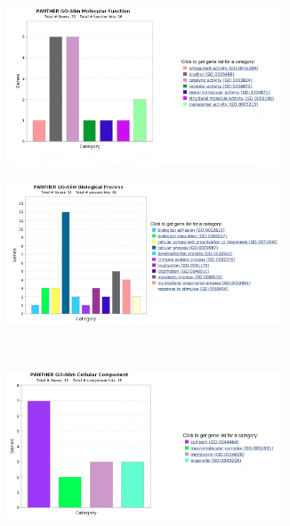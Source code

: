 \begin{figure}[H]
\label{adfigure}
\begin{subfigure}[b]{0.5\linewidth}
\centering
\includegraphics[width=0.9\textwidth]{./Figures/GO/ad/ad1}\par
\end{subfigure}
\begin{subfigure}[b]{0.5\linewidth}
\centering
\includegraphics[width=0.9\textwidth]{./Figures/GO/ad/ad2}\par
\end{subfigure}\\
\begin{subfigure}[b]{0.5\linewidth}
\centering
\includegraphics[width=0.9\textwidth]{./Figures/GO/ad/ad3}\par

\end{subfigure}
\end{figure}
